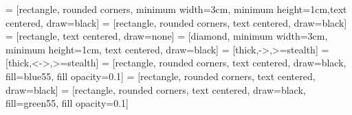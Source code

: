\setlength{\fboxsep}{0pt}


 		= [rectangle, rounded corners, minimum width=3cm, minimum height=1cm,text centered, draw=black]
			= [rectangle, rounded corners, text centered, draw=black]
 			= [rectangle, text centered, draw=none]
 		= [diamond, minimum width=3cm, minimum height=1cm, text centered, draw=black]
 			= [thick,->,>=stealth]
 			= [thick,<->,>=stealth]
 	= [rectangle, rounded corners, text centered, draw=black, fill=blue55, fill opacity=0.1]
 			= [rectangle, rounded corners, text centered, draw=black]
 	= [rectangle, rounded corners, text centered, draw=black, fill=green55, fill opacity=0.1]





